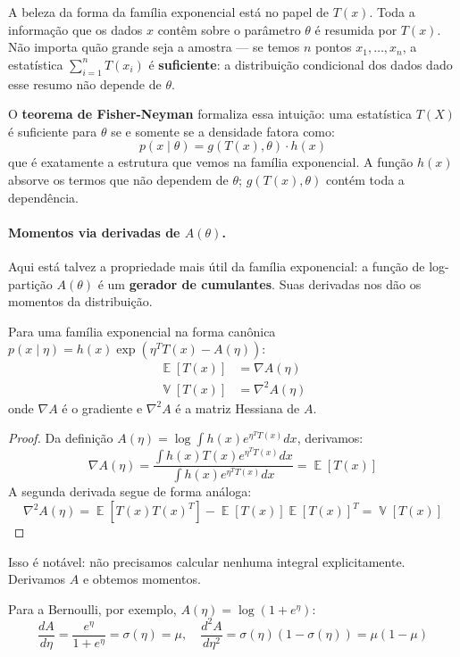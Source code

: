 \documentclass{tufte-handout}
\DeclareMathOperator{\E}{\mathbb{E}}
\DeclareMathOperator{\Var}{\mathbb{V}}
\begin{document}
A beleza da forma da família exponencial está no papel de $T(x)$. Toda a informação que os dados $x$ contêm sobre o parâmetro $\theta$ é resumida por $T(x)$. Não importa quão grande seja a amostra --- se temos $n$ pontos $x_1,\dots,x_n$, a estatística $\sum_{i=1}^n T(x_i)$ é \textbf{suficiente}: a distribuição condicional dos dados dado esse resumo não depende de $\theta$.

O \textbf{teorema de Fisher-Neyman} formaliza essa intuição: uma estatística $T(X)$ é suficiente para $\theta$ se e somente se a densidade fatora como:
\[
p(x \mid \theta) = g(T(x), \theta) \cdot h(x)
\]
que é exatamente a estrutura que vemos na família exponencial. A função $h(x)$ absorve os termos que não dependem de $\theta$; $g(T(x), \theta)$ contém toda a dependência.

\paragraph{Momentos via derivadas de $A(\theta)$.}

Aqui está talvez a propriedade mais útil da família exponencial: a função de log-partição $A(\theta)$ é um \textbf{gerador de cumulantes}. Suas derivadas nos dão os momentos da distribuição.

\begin{thm}
    Para uma família exponencial na forma canônica $p(x \mid \eta) = h(x) \exp(\eta^T T(x) - A(\eta))$:
    \begin{align*}
        \E[T(x)] &= \nabla A(\eta) \\
        \Var[T(x)] &= \nabla^2 A(\eta)
    \end{align*}
    onde $\nabla A$ é o gradiente e $\nabla^2 A$ é a matriz Hessiana de $A$.
\end{thm}

\begin{proof}
    Da definição $A(\eta) = \log \int h(x) e^{\eta^T T(x)} dx$, derivamos:
    \[
    \nabla A(\eta) = \frac{\int h(x) T(x) e^{\eta^T T(x)} dx}{\int h(x) e^{\eta^T T(x)} dx} = \E[T(x)]
    \]
    A segunda derivada segue de forma análoga:
    \[
    \nabla^2 A(\eta) = \E[T(x)T(x)^T] - \E[T(x)]\E[T(x)]^T = \Var[T(x)]
    \]
\end{proof}

Isso é notável: não precisamos calcular nenhuma integral explicitamente. Derivamos $A$ e obtemos momentos.

Para a Bernoulli, por exemplo, $A(\eta) = \log(1+e^\eta)$:
\[
\frac{dA}{d\eta} = \frac{e^\eta}{1+e^\eta} = \sigma(\eta) = \mu, \quad \frac{d^2A}{d\eta^2} = \sigma(\eta)(1-\sigma(\eta)) = \mu(1-\mu)
\]
\end{document}
